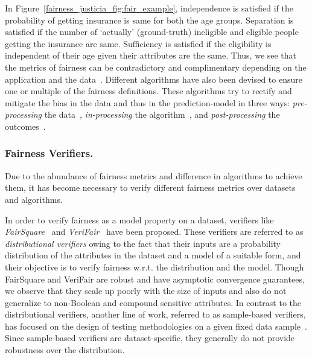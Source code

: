 In Figure~\ref{fairness_justicia_fig:fair_example}, independence is satisfied if the probability of getting insurance is same for both the age groups. Separation is satisfied if the number of `actually' (ground-truth) ineligible and eligible people getting the insurance are same. Sufficiency is satisfied if the eligibility is independent of their age given their attributes are the same.
Thus, we see that the metrics of fairness can be contradictory and complimentary depending on the application and the data~\cite{corbett2018measure}.
Different algorithms have also been devised to ensure one or multiple of the fairness definitions.
These algorithms try to rectify and mitigate the bias in the data and thus in the prediction-model in three ways: \textit{pre-processing} the data~\cite{kamiran2012data,zemel2013learning,calmon2017optimized}, \textit{in-processing} the algorithm~\cite{zhang2018mitigating}, and \textit{post-processing} the outcomes~\cite{kamiran2012decision,hardt2016equality}.

\subsubsection{Fairness Verifiers.} Due to the abundance of fairness metrics and difference in algorithms to achieve them, it has become necessary to verify different fairness metrics over datasets and algorithms. 

In order to verify fairness as a model property on a dataset, verifiers like \textit{FairSquare}~\cite{albarghouthi2017fairsquare} and \textit{VeriFair}~\cite{bastani2019probabilistic} have been proposed. 
These verifiers are referred to as {\em distributional verifiers} owing to the fact that their inputs are a probability  distribution of the attributes in the dataset and a model of a suitable form, and their objective is to verify fairness w.r.t. the distribution and the model.
Though FairSquare and VeriFair are robust and have asymptotic convergence guarantees, we observe that they scale up poorly with the size of inputs and also do not generalize to non-Boolean and compound sensitive attributes.
In contrast to the distributional verifiers, another line of work, referred to as sample-based verifiers, has focused on the design of testing methodologies  on a given fixed data sample~\cite{galhotra2017fairness,aif360-oct-2018}. 
Since sample-based verifiers are dataset-specific, they generally do not provide robustness over the distribution.


